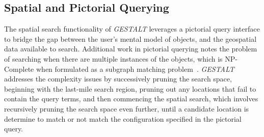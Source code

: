 \subsection{Spatial and Pictorial Querying}
The spatial search functionality of \emph{GESTALT} leverages a pictorial query interface to bridge the gap between the user's mental model of objects, and the geospatial data available to search. 
Additional work in pictorial querying notes the problem of searching when there are multiple instances of the objects, which is NP-Complete when formulated as a subgraph matching problem~\cite{Folkers2000}. 
\textit{GESTALT} addresses the complexity issues by successively pruning the search space, beginning with the last-mile search region, pruning out any locations that fail to contain the query terms, and then commencing the spatial search, which involves recursively pruning the search space even further, until a candidate location is determine to match or not match the configuration specified in the pictorial query.



